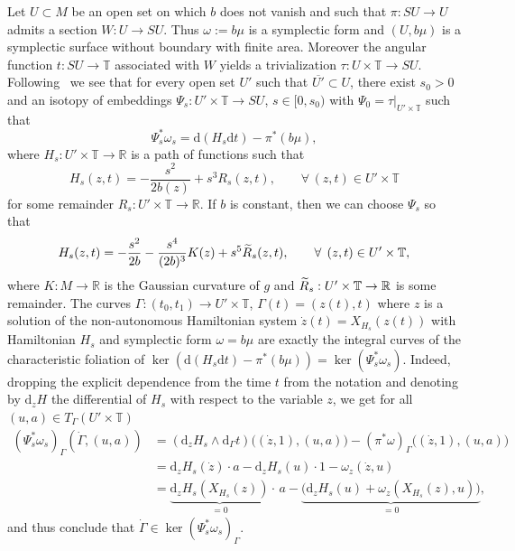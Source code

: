 \documentclass[10pt]{amsart}
\theoremstyle{definition}
\newcommand{\R}{\mathbb{R}}
\newcommand{\T}{\mathbb{T}}
\newcommand{\diff}{\mathrm{d}}
\let\oldtilde\tilde
\renewcommand*{\tilde}[1]{\mathchoice{\widetilde{#1}}{\widetilde{#1}}{\oldtilde{#1}}{\oldtilde{#1}}}
\let\oldforall\forall
\renewcommand*{\forall}{\mathrel{\oldforall}}
\begin{document}
Let $U\subset M$ be an open set on which $b$ does not vanish and such that $\pi:SU\to U$ admits a section $W:U\to SU$. Thus $\omega:=b\mu$ is a symplectic form and $(U,b\mu)$ is a symplectic surface without boundary with finite area. Moreover the angular function $t:SU\to \T$ associated with $W$ yields a trivialization $\tau:U\times \T\to SU$. Following~\cite[Theorem~1.1]{AB21} we see that for every open set $U'$ such that $\overline{U'}\subset U$, there exist $s_0>0$ and an isotopy of embeddings $\Psi_s:U'\times\T\to SU$, $s\in[0,s_0)$ with $\Psi_0=\tau|_{U'\times\T}$ such that
\[
\Psi_s^*\omega_s=\diff\left(H_s\diff t\right)-\pi^*(b\mu),
\]
where $H_s:U'\times\T\to\R$ is a path of functions such that
\begin{equation}\label{e:H1}
H_s(z,t)=-\frac{s^2}{2b(z)}+s^3R_s(z,t),\qquad \forall\,(z,t)\in U'\times\T
\end{equation}
for some remainder $R_s:U'\times\T\to \R$. If $b$ is constant, then we can choose $\Psi_s$ so that
\begin{equation}\label{e:H2}
H_s(z,t)=-\frac{s^2}{2b}-\frac{s^4}{(2b)^3}K(z)+s^5\tilde R_s(z,t),\qquad\forall\,(z,t)\in U'\times\T,
\end{equation}
where $K:M\to\R$ is the Gaussian curvature of $g$ and $\tilde R_s:U'\times\T\to\R$ is some remainder. The curves $\Gamma:(t_0,t_1)\to U'\times\T$, $\Gamma(t)=(z(t),t)$ where $z$ is a solution of the non-autonomous Hamiltonian system $\dot z(t)=X_{H_s}(z(t))$ with Hamiltonian $H_s$ and symplectic form $\omega=b\mu$ are exactly the integral curves of the characteristic foliation of $\ker(\diff(H_s\diff t)-\pi^*(b\mu))=\ker(\Psi_s^*\omega_s)$. Indeed, dropping the explicit dependence from the time $t$ from the notation and denoting by $\diff_z H$ the differential of $H_s$ with respect to the variable $z$, we get for all $(u,a)\in T_\Gamma (U'\times\T)$
\begin{align*}
\left(\Psi_s^* \omega_s\right)_{\Gamma} \left(\dot \Gamma,(u,a)\right) &= \left(\diff_z H_s \wedge \diff_\Gamma t\right)\big((\dot z,1),(u,a)\big) - \left(\pi^*\omega\right)_{\Gamma}\big((\dot z,1),(u,a)\big)\\
&= \diff_z H_s (\dot z) \cdot a-\diff_z H_s (u)\cdot 1 - \omega_z(\dot z,u)\\
&=\underbrace{\diff_z H_s\left(X_{H_s}(z)\right)}_{=0} \cdot\,a - \underbrace{ \big(\diff_z H_s (u) + \omega_z\left(X_{H_s}(z),u\right)\big) }_{=0},
\end{align*}
and thus conclude that $\dot \Gamma \in \ker (\Psi^*_s\omega_s)_{\Gamma}$.
\end{document}
